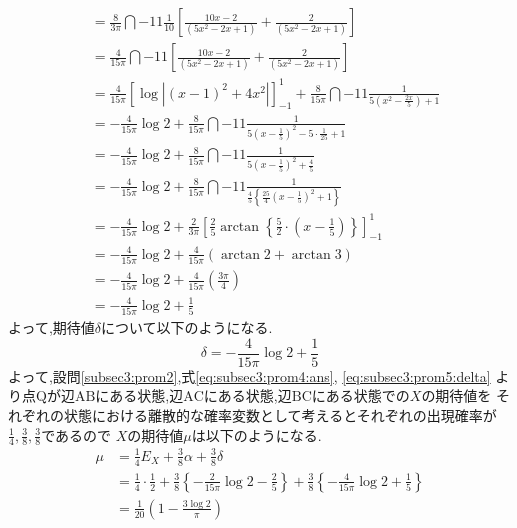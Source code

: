 \documentclass[dvipdfmx,titlepage, 11pt, a4paper]{jsarticle}%
\begin{document}
\begin{enumerate}[(1)]
\begin{align*}
          &= \frac{8}{3\pi}\dint{-1}{1}{\frac{1}{10}\left[\frac{10x - 2}{(5x^2 - 2x + 1)} + \frac{2}{(5x^2 - 2x + 1)}\right]}\\
          &= \frac{4}{15\pi}\dint{-1}{1}{\left[\frac{10x - 2}{(5x^2 - 2x + 1)} + \frac{2}{(5x^2 - 2x + 1)}\right]}\\
          &= \frac{4}{15\pi}\left[\log |(x - 1)^2 + 4x^2|\right]_{-1}^{1} + \frac{8}{15\pi}\dint{-1}{1}{\frac{1}{5(x^2 - \frac{2x}{5}) + 1}}\\
          &= -\frac{4}{15\pi}\log 2 + \frac{8}{15\pi}\dint{-1}{1}{\frac{1}{5(x - \frac{1}{5})^2 - 5\cdot \frac{1}{25} + 1}}\\
          &= -\frac{4}{15\pi}\log 2 + \frac{8}{15\pi}\dint{-1}{1}{\frac{1}{5(x - \frac{1}{5})^2 + \frac{4}{5}}}\\
          &= -\frac{4}{15\pi}\log 2 + \frac{8}{15\pi}\dint{-1}{1}{\frac{1}{\frac{4}{5}\left\{\frac{25}{4}(x - \frac{1}{5})^2 + 1\right\}}}\\
          &= -\frac{4}{15\pi}\log 2 + \frac{2}{3\pi}\left[\frac{2}{5}\arctan \left\{\frac{5}{2}\cdot \left(x - \frac{1}{5}\right)\right\}\right]_{-1}^{1}\\
          &= -\frac{4}{15\pi}\log 2 + \frac{4}{15\pi}(\arctan 2 + \arctan 3)\\
          &= -\frac{4}{15\pi}\log 2 + \frac{4}{15\pi}\left(\frac{3\pi}{4}\right)\\
          &= -\frac{4}{15\pi}\log 2 + \frac{1}{5}
  \end{align*}
  よって,期待値$\delta$について以下のようになる.
  \begin{equation}
    \delta = -\frac{4}{15\pi}\log 2 + \frac{1}{5}\label{eq:subsec3:prom5:delta}
  \end{equation}
  よって,設問\eqref{subsec3:prom2},式\eqref{eq:subsec3:prom4:ans}, \eqref{eq:subsec3:prom5:delta}
  より点$\mathrm{Q}$が辺$\mathrm{AB}$にある状態,辺$\mathrm{AC}$にある状態,辺$\mathrm{BC}$にある状態での$X$の期待値を
  それぞれの状態における離散的な確率変数として考えるとそれぞれの出現確率が$\frac{1}{4}, \frac{3}{8}, \frac{3}{8}$であるので
  $X$の期待値$\mu$は以下のようになる.
  \begin{align*}
    \mu &= \frac{1}{4}E_{X} + \frac{3}{8}\alpha + \frac{3}{8}\delta\\
        &= \frac{1}{4}\cdot\frac{1}{2} 
          + \frac{3}{8}\left\{-\frac{2}{15\pi}\log 2-\frac{2}{5}\right\}
          + \frac{3}{8}\left\{-\frac{4}{15\pi}\log 2 + \frac{1}{5}\right\}\\
        &= \frac{1}{20}\left(1 - \frac{3\log 2}{\pi}\right)
  \end{align*}
\end{enumerate}
\end{document}
